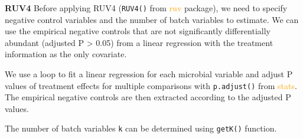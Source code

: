 \documentclass[
]{book}
\newenvironment{Shaded}{\begin{snugshade}}{\end{snugshade}}
\newcommand{\AttributeTok}[1]{\textcolor[rgb]{0.77,0.63,0.00}{#1}}
\newcommand{\CommentTok}[1]{\textcolor[rgb]{0.56,0.35,0.01}{\textit{#1}}}
\newcommand{\ControlFlowTok}[1]{\textcolor[rgb]{0.13,0.29,0.53}{\textbf{#1}}}
\newcommand{\DecValTok}[1]{\textcolor[rgb]{0.00,0.00,0.81}{#1}}
\newcommand{\FloatTok}[1]{\textcolor[rgb]{0.00,0.00,0.81}{#1}}
\newcommand{\FunctionTok}[1]{\textcolor[rgb]{0.00,0.00,0.00}{#1}}
\newcommand{\NormalTok}[1]{#1}
\newcommand{\OtherTok}[1]{\textcolor[rgb]{0.56,0.35,0.01}{#1}}
\newcommand{\SpecialCharTok}[1]{\textcolor[rgb]{0.00,0.00,0.00}{#1}}
\newcommand{\StringTok}[1]{\textcolor[rgb]{0.31,0.60,0.02}{#1}}
\begin{document}
\textbf{RUV4} Before applying RUV4 (\texttt{RUV4()} from \textcolor{orange}{ruv} package), we need to specify negative control variables and the number of batch variables to estimate. We can use the empirical negative controls that are not significantly differentially abundant (adjusted P \textgreater{} 0.05) from a linear regression with the treatment information as the only covariate.

We use a loop to fit a linear regression for each microbial variable and adjust P values of treatment effects for multiple comparisons with \texttt{p.adjust()} from \textcolor{orange}{stats}. The empirical negative controls are then extracted according to the adjusted P values.

\begin{Shaded}
\end{Shaded}

The number of batch variables \texttt{k} can be determined using \texttt{getK()} function.

\begin{Shaded}
\end{Shaded}
\end{document}
